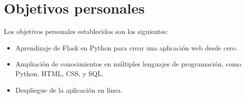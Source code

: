 \section{Objetivos personales}
Los objetivos personales establecidos son los siguientes:
\begin{itemize}
    \item Aprendizaje de Flask en Python para crear una aplicación web desde cero.
    \item Ampliación de conocimientos en múltiples lenguajes de programación, como Python, HTML, CSS, y SQL.
    \item Despliegue de la aplicación en línea.
\end{itemize}